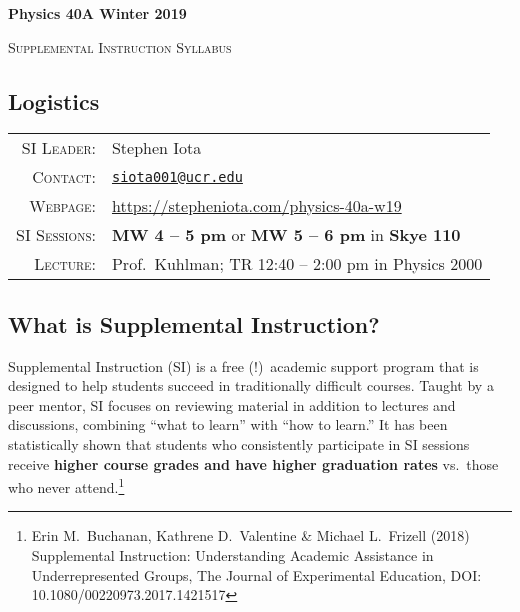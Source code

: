 \documentclass[11pt]{article}
\begin{document}
\begin{center}
\Large\textbf{{Physics 40A Winter 2019}}

\large{\textsc{Supplemental Instruction Syllabus}} 


\end{center}





\subsection*{Logistics}

\begin{tabular}{rl}

\textsc{SI Leader}:
&
Stephen Iota
\\
\textsc{Contact}:
&
\href{mailto:siota001@ucr.edu}{\texttt{siota001@ucr.edu}}
\\
\textsc{Webpage}:
&
\url{https://stepheniota.com/physics-40a-w19}
\\
\textsc{SI Sessions}:
&
\textbf{MW 4 -- 5 pm} or \textbf{MW 5 -- 6 pm} in \textbf{Skye 110}
\\
\textsc{Lecture:}
&
Prof.~Kuhlman; TR 12:40 -- 2:00 pm  in Physics 2000
\\
\end{tabular}







\subsection*{What is Supplemental Instruction?}

Supplemental Instruction \textsc{(SI)} is a free (!)\ academic support program that is designed to help students succeed in traditionally difficult courses. 
Taught by a peer mentor, SI focuses on reviewing material in addition to lectures and discussions, combining ``what to learn'' with ``how to learn.''
It has been statistically shown that students who consistently participate in SI sessions receive \textbf{higher course grades and have higher graduation rates} vs.~those who never attend.\footnote{Erin M.~Buchanan, Kathrene D.~Valentine \& Michael L.~Frizell (2018) Supplemental Instruction: Understanding Academic Assistance in Underrepresented Groups, The Journal of Experimental Education, DOI: 10.1080/00220973.2017.1421517}
\end{document}
